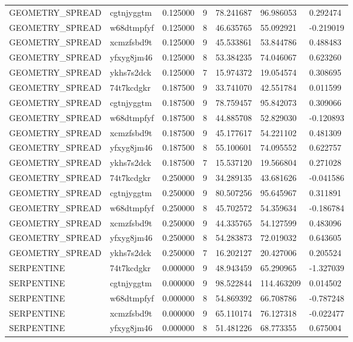 \begin{tabular}{lllllll}
GEOMETRY\_SPREAD & cgtnjyggtm & 0.125000 & 9 & 78.241687 & 96.986053 & 0.292474 \\
GEOMETRY\_SPREAD & w68dtmpfyf & 0.125000 & 8 & 46.635765 & 55.092921 & -0.219019 \\
GEOMETRY\_SPREAD & xcmzfsbd9t & 0.125000 & 9 & 45.533861 & 53.844786 & 0.488483 \\
GEOMETRY\_SPREAD & yfxyg8jm46 & 0.125000 & 8 & 53.384235 & 74.046067 & 0.623260 \\
GEOMETRY\_SPREAD & ykhs7s2dck & 0.125000 & 7 & 15.974372 & 19.054574 & 0.308695 \\
GEOMETRY\_SPREAD & 74t7kcdgkr & 0.187500 & 9 & 33.741070 & 42.551784 & 0.011599 \\
GEOMETRY\_SPREAD & cgtnjyggtm & 0.187500 & 9 & 78.759457 & 95.842073 & 0.309066 \\
GEOMETRY\_SPREAD & w68dtmpfyf & 0.187500 & 8 & 44.885708 & 52.829030 & -0.120893 \\
GEOMETRY\_SPREAD & xcmzfsbd9t & 0.187500 & 9 & 45.177617 & 54.221102 & 0.481309 \\
GEOMETRY\_SPREAD & yfxyg8jm46 & 0.187500 & 8 & 55.100601 & 74.095552 & 0.622757 \\
GEOMETRY\_SPREAD & ykhs7s2dck & 0.187500 & 7 & 15.537120 & 19.566804 & 0.271028 \\
GEOMETRY\_SPREAD & 74t7kcdgkr & 0.250000 & 9 & 34.289135 & 43.681626 & -0.041586 \\
GEOMETRY\_SPREAD & cgtnjyggtm & 0.250000 & 9 & 80.507256 & 95.645967 & 0.311891 \\
GEOMETRY\_SPREAD & w68dtmpfyf & 0.250000 & 8 & 45.702572 & 54.359634 & -0.186784 \\
GEOMETRY\_SPREAD & xcmzfsbd9t & 0.250000 & 9 & 44.335765 & 54.127599 & 0.483096 \\
GEOMETRY\_SPREAD & yfxyg8jm46 & 0.250000 & 8 & 54.283873 & 72.019032 & 0.643605 \\
GEOMETRY\_SPREAD & ykhs7s2dck & 0.250000 & 7 & 16.202127 & 20.427006 & 0.205524 \\
SERPENTINE & 74t7kcdgkr & 0.000000 & 9 & 48.943459 & 65.290965 & -1.327039 \\
SERPENTINE & cgtnjyggtm & 0.000000 & 9 & 98.522844 & 114.463209 & 0.014502 \\
SERPENTINE & w68dtmpfyf & 0.000000 & 8 & 54.869392 & 66.708786 & -0.787248 \\
SERPENTINE & xcmzfsbd9t & 0.000000 & 9 & 65.110174 & 76.127318 & -0.022477 \\
SERPENTINE & yfxyg8jm46 & 0.000000 & 8 & 51.481226 & 68.773355 & 0.675004 \\

\end{tabular}
